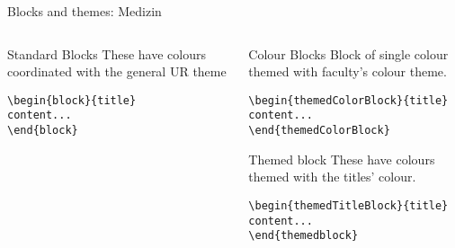 \begingroup
{}
\begin{frame}[fragile]{Blocks and themes: Medizin}
\begin{columns} %
\begin{column}{0.3\textwidth}
\begin{block}{Standard Blocks}
These have colours coordinated with the general UR theme
\begin{verbatim}
\begin{block}{title}
content...
\end{block}
\end{verbatim}
\end{block}
\end{column}
\begin{column}{0.7\textwidth}
\begin{themedColorBlock}{Colour Blocks}
Block of single colour themed with faculty's colour theme.
\small
\begin{verbatim}
\begin{themedColorBlock}{title}
content...
\end{themedColorBlock}
\end{verbatim}
\end{themedColorBlock}
\begin{themedTitleBlock} {Themed block}
These have colours themed with the titles' colour.
\small
\begin{verbatim}
\begin{themedTitleBlock}{title}
content...
\end{themedblock}
\end{verbatim}
\end{themedTitleBlock}
\end{column}
\end{columns}
\end{frame}
\endgroup



